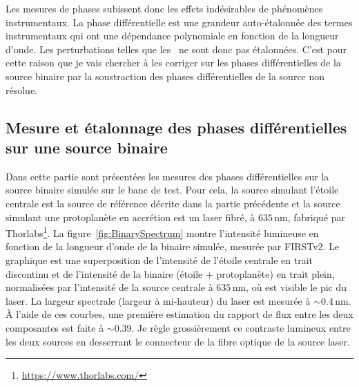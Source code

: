 Les mesures de phases subissent donc les effets indésirables de phénomènes instrumentaux. La phase différentielle est une grandeur auto-étalonnée des termes instrumentaux qui ont une dépendance polynomiale en fonction de la longueur d'onde. Les perturbations telles que les \wiggles~ne sont donc pas étalonnées. C'est pour cette raison que je vais chercher à les corriger sur les phases différentielles de la source binaire par la soustraction des phases différentielles de la source non résolue.


\subsection{Mesure et étalonnage des phases différentielles sur une source binaire}
\label{sec:PhaseDiffMesure}

Dans cette partie sont présentées les mesures des phases différentielles sur la source binaire simulée sur le banc de test. Pour cela, la source simulant l'étoile centrale est la source de référence décrite dans la partie précédente et la source simulant une protoplanète en accrétion est un laser fibré, à $635 \,$nm, fabriqué par Thorlabs\footnote{\url{https://www.thorlabs.com/}}. La figure~\ref{fig:BinarySpectrum} montre l'intensité lumineuse en fonction de la longueur d'onde de la binaire simulée, mesurée par \ac{FIRSTv2}. Le graphique est une superposition de l'intensité de l'étoile centrale en trait discontinu et de l'intensité de la binaire (étoile + protoplanète) en trait plein, normalisées par l'intensité de la source centrale à $635 \,$nm, où est visible le pic du laser. La largeur spectrale (largeur à mi-hauteur) du laser est mesurée à $\sim 0.4 \,$nm. À l'aide de ces courbes, une première estimation du rapport de flux entre les deux composantes est faite à $\sim 0.39$. Je règle grossièrement ce contraste lumineux entre les deux sources en desserrant le connecteur de la fibre optique de la source laser.

